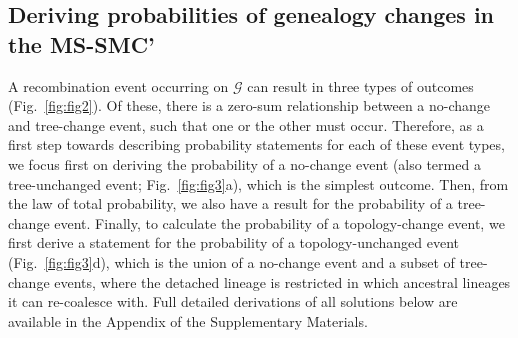 \documentclass[11pt]{article}
\begin{document}


\subsection{Deriving probabilities of genealogy changes in the MS-SMC'}
A recombination event occurring on $\mathcal{G}$ can result 
in three types of outcomes (Fig.~\ref{fig:fig2}).
Of these, there is a zero-sum relationship between a no-change and 
tree-change event, such that one or the other must occur.
Therefore, as a first step towards describing probability statements 
for each of these event types, we focus first on deriving the 
probability of a no-change event 
(also termed a tree-unchanged event; Fig.~\ref{fig:fig3}a), 
which is the simplest outcome. Then, from the law of total probability, 
we also have a result for the probability of a tree-change event. 
Finally, to calculate the probability of a topology-change event, 
we first derive a statement for the probability of a topology-unchanged event
(Fig.~\ref{fig:fig3}d), which is the union of a no-change event and
a subset of tree-change events,
where the detached lineage is restricted in which ancestral lineages 
it can re-coalesce with. 
Full detailed derivations of all solutions below are available in the 
Appendix of the Supplementary Materials.
\end{document}
